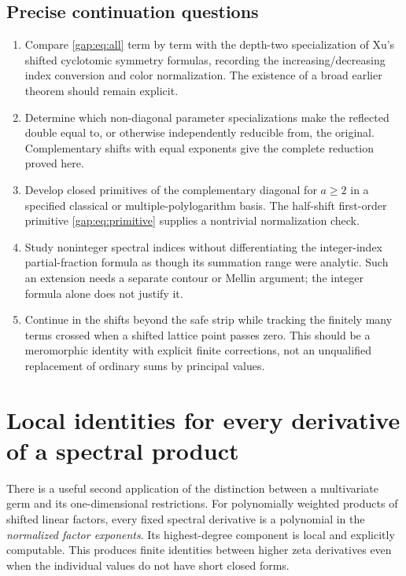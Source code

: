 \documentclass[11pt,letterpaper]{article}
\numberwithin{equation}{section}
\theoremstyle{plain}
\theoremstyle{definition}
\theoremstyle{remark}
\begin{document}
\subsection{Precise continuation questions}

\begin{enumerate}
\item Compare \eqref{gap:eq:all} term by term with the depth-two
specialization of Xu's shifted cyclotomic symmetry formulas, recording
the increasing/decreasing index conversion and color normalization.
The existence of a broad earlier theorem should remain explicit.
\item Determine which non-diagonal parameter specializations make the
reflected double equal to, or otherwise independently reducible from,
the original. Complementary shifts with equal exponents give the
complete reduction proved here.
\item Develop closed primitives of the complementary diagonal for
$a\geq2$ in a specified classical or multiple-polylogarithm basis.
The half-shift first-order primitive \eqref{gap:eq:primitive} supplies
a nontrivial normalization check.
\item Study noninteger spectral indices without differentiating the
integer-index partial-fraction formula as though its summation range
were analytic. Such an extension needs a separate contour or Mellin
argument; the integer formula alone does not justify it.
\item Continue in the shifts beyond the safe strip while tracking the
finitely many terms crossed when a shifted lattice point passes zero.
This should be a meromorphic identity with explicit finite
corrections, not an unqualified replacement of ordinary sums by
principal values.
\end{enumerate}

\section{Local identities for every derivative of a spectral product}
\label{sec:spectral}

There is a useful second application of the distinction between a
multivariate germ and its one-dimensional restrictions. For polynomially
weighted products of shifted linear factors, every fixed spectral
derivative is a polynomial in the \emph{normalized factor exponents}.
Its highest-degree component is local and explicitly computable. This
produces finite identities between higher zeta derivatives even when the
individual values do not have short closed forms.
\end{document}
